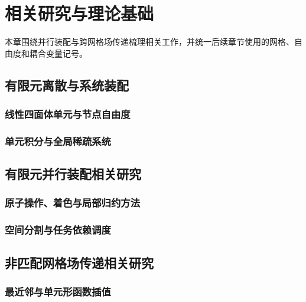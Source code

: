 \chapter{相关研究与理论基础}
\label{chap:foundations}

本章围绕并行装配与跨网格场传递梳理相关工作，并统一后续章节使用的网格、自由度和耦合变量记号。

\section{有限元离散与系统装配}
\subsection{线性四面体单元与节点自由度}
\thesisdraftnote

\subsection{单元积分与全局稀疏系统}
\thesisdraftnote

\section{有限元并行装配相关研究}
\subsection{原子操作、着色与局部归约方法}
\thesisdraftnote

\subsection{空间分割与任务依赖调度}
\thesisdraftnote

\section{非匹配网格场传递相关研究}
\subsection{最近邻与单元形函数插值}
\thesisdraftnote

